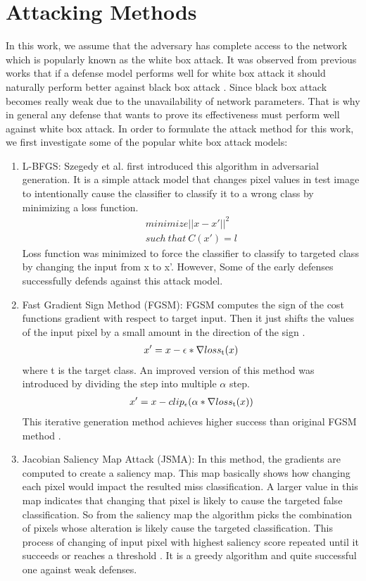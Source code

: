 \documentclass[conference]{IEEEtran}
\begin{document}
\section{Attacking Methods}
In this work, we assume that the adversary has complete access to the network which is popularly known as the white box attack. It was observed from previous works that if a defense model performs well for white box attack it should naturally perform better against black box attack \cite{mkadry2017towards}. Since black box attack becomes really weak due to the unavailability of network parameters. That is why in general any defense that wants to prove its effectiveness must perform well against white box attack. In order to formulate the attack method for this work, we first investigate some of the popular white box attack models:
\begin{enumerate}
\item L-BFGS: Szegedy et al. \cite{szegedy2013intriguing} first introduced this algorithm in adversarial generation. It is a simple attack model that changes pixel values in test image to intentionally cause the classifier to classify it to a wrong class by minimizing a loss function.
\begin{gather*}
minimize ||x-x'||^2 \\ such\ that\ C(x')= l
\end{gather*}
Loss function was minimized to force the classifier to classify to targeted class by changing the input from x to x'. However, Some of the early defenses successfully defends against this attack model.

   
\item Fast Gradient Sign Method (FGSM): FGSM computes the sign of the cost functions gradient with respect to target input. Then it just shifts the values of the input pixel by a small amount in the direction of the sign \cite{goodfellow2014explaining}. 
\begin{gather*}{x'=x - \epsilon * \nabla loss_\textup{t}(x)}
\end{gather*}
where t is the target class. An improved version of this method was introduced by dividing the step into multiple $\alpha$ step.
\begin{gather*}{x'=x - clip_\textup{$\epsilon$} (\alpha * \nabla loss_\textup{t}(x))}
\end{gather*}
This iterative generation method achieves higher success than original FGSM method \cite{kurakin2016adversarial}.

\item Jacobian Saliency Map Attack (JSMA): In this method, the gradients are computed to create a saliency map. This map basically shows how changing each pixel would impact the resulted miss classification.  A larger value in this map indicates that changing that pixel is likely to cause the targeted false classification. So from the saliency map the algorithm picks the combination of pixels whose alteration is likely cause the targeted classification. This process of changing of input pixel with highest saliency score repeated until it succeeds or reaches a threshold \cite{papernot2016limitations}. It is a greedy algorithm and quite successful one against weak defenses.


\end{enumerate}
\end{document}
